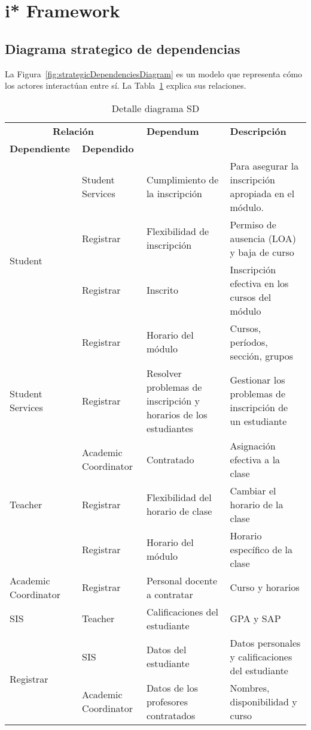 \section{i* Framework}
\label{sec:appendixIStarAnalysis}

\subsection*{Diagrama strategico de dependencias}
La Figura~\ref{fig:strategicDependenciesDiagram} es un modelo que representa cómo los actores interactúan entre sí.
La Tabla~\ref{tab:strategicDependencies} explica sus relaciones.
\begin{table}
\centering
\caption{Detalle diagrama SD} \label{tab:strategicDependencies}
	\begin{tabularx}{\linewidth}{@{} p{0.8in} p{1.2in} p{1.6in} X @{}}
	\toprule
	\multicolumn{2}{c}{\textbf{Relación}} & \textbf{Dependum} & \textbf{Descripción} \\
	\cmidrule(lr){1-2}
	\textbf{Dependiente} & \textbf{Dependido} & & \\
	\midrule
	\multirow{4}{*}{Student} & Student Services & Cumplimiento de la inscripción & Para asegurar la inscripción apropiada en el módulo. \\
	& Registrar & Flexibilidad de inscripción & Permiso de ausencia (LOA) y baja de curso \\
	& Registrar & Inscrito & Inscripción efectiva en los cursos del módulo \\
	& Registrar & Horario del módulo & Cursos, períodos, sección, grupos \\
	\hline
	Student Services & Registrar & Resolver problemas de inscripción y horarios de los estudiantes & Gestionar los problemas de inscripción de un estudiante\\
	\hline
	\multirow{3}{*}{Teacher} & Academic Coordinator & Contratado & Asignación efectiva a la clase \\
	& Registrar & Flexibilidad del horario de clase & Cambiar el horario de la clase \\
	& Registrar & Horario del módulo & Horario específico de la clase \\
	\hline
	Academic Coordinator & Registrar & Personal docente a contratar & Curso y horarios \\
	\hline
	SIS & Teacher & Calificaciones del estudiante & GPA y SAP\\
	\hline
	\multirow{2}{*}{Registrar} & SIS & Datos del estudiante & Datos personales y calificaciones del estudiante\\
	& Academic Coordinator & Datos de los profesores contratados & Nombres, disponibilidad y curso\\
	\bottomrule
	\end{tabularx}
\end{table}

